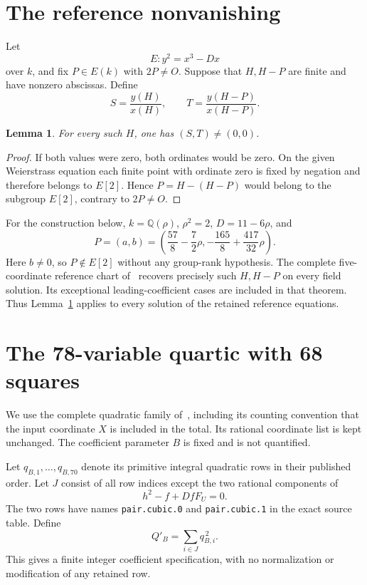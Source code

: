 \documentclass[11pt,a4paper]{article}
\newtheorem{lemma}[theorem]{Lemma}
\theoremstyle{remark}\newtheorem{remark}[theorem]{Remark}
\newcommand{\Q}{\mathbb Q}\newcommand{\Z}{\mathbb Z}
\begin{document}
\section{The reference nonvanishing}
Let
\[
                    E:y^2=x^3-Dx
\]
over $k$, and fix $P\in E(k)$ with $2P\ne O$. Suppose that $H,H-P$
are finite and have nonzero abscissas. Define
\[
             S=\frac{y(H)}{x(H)},\qquad
             T=\frac{y(H-P)}{x(H-P)}.
\]

\begin{lemma}\label{lem:nonvanishing}
For every such $H$, one has $(S,T)\ne(0,0)$.
\end{lemma}
\begin{proof}
If both values were zero, both ordinates would be zero. On the given
Weierstrass equation each finite point with ordinate zero is fixed by
negation and therefore belongs to $E[2]$. Hence
$P=H-(H-P)$ would belong to the subgroup $E[2]$, contrary to $2P\ne O$.
\end{proof}

For the construction below, $k=\Q(\rho)$, $\rho^2=2$,
$D=11-6\rho$, and
\[
 P=(a,b)=\left(\frac{57}{8}-\frac72\rho,
                  -\frac{165}{8}+\frac{417}{32}\rho\right).
\]
Here $b\ne0$, so $P\notin E[2]$ without any group-rank hypothesis.
The complete five-coordinate reference chart of~\cite{Reference}
recovers precisely such $H,H-P$ on every field solution. Its exceptional
leading-coefficient cases are included in that theorem. Thus
Lemma~\ref{lem:nonvanishing} applies to every solution of the retained
reference equations.

\section{The 78-variable quartic with 68 squares}
We use the complete quadratic family of~\cite{ABC78}, including its
counting convention that the input coordinate $X$ is included in the
total. Its rational coordinate list is kept unchanged. The coefficient
parameter $B$ is fixed and is not quantified.

Let $q_{B,1},\ldots,q_{B,70}$ denote its primitive integral quadratic
rows in their published order. Let $J$ consist of all row indices except
the two rational components of
\begin{equation}\label{eq:deleted}
                         h^2-f+DfF_U=0.
\end{equation}
The two rows have names \texttt{pair.cubic.0} and
\texttt{pair.cubic.1} in the exact source table. Define
\begin{equation}\label{eq:polynomial}
                       Q'_B=\sum_{i\in J}q_{B,i}^{\,2}.
\end{equation}
This gives a finite integer coefficient specification, with no
normalization or modification of any retained row.
\end{document}
